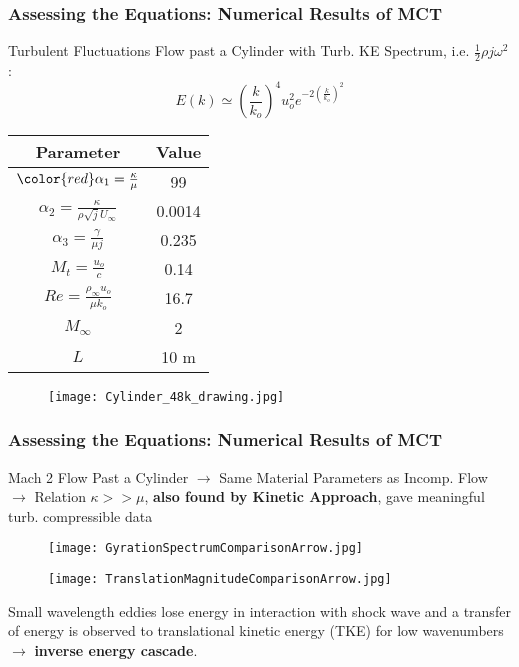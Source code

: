 \documentclass{beamer}
\begin{document}
\begin{frame}
\frametitle{Assessing the Equations: Numerical Results of MCT}
Turbulent Fluctuations Flow past a Cylinder with Turb. KE Spectrum, i.e. 
$\frac{1}{2}\rho j \omega^2$: $$E(k) \simeq (\frac{k}{k_{o}})^4 u_{o}^2 
e^{-2(\frac{k}{k_{o}})^2}$$
\begin{multicols}{2}
\begin{table}[h!]
\centering
 \begin{tabular}{||c | c||} 
 \hline
 Parameter & Value \\ [2ex] 
 \hline\hline
 ${\color{red}\alpha_{1} = \frac{\kappa}{\mu}}$ & 99 \\ 
 $\alpha_{2} = \frac{\kappa}{\rho \sqrt{j}U_{\infty}}$ & 0.0014 \\ 
 $\alpha_{3} = \frac{\gamma}{\mu j}$ & 0.235 \\ 
 $M_{t} = \frac{u_{o}}{c}$      & 0.14\\ 
 $Re = \frac{\rho_{\infty} u_{o}}{\mu k_{o}}$ & 16.7 \\ 
 $M_{\infty}$ & 2\\ 
 $L$ & 10 m\\ 
 \hline
 \end{tabular}
\end{table}
\begin{figure}
\texttt{[image: Cylinder\_48k\_drawing.jpg]}
\end{figure}
\end{multicols}
\end{frame}

\begin{frame}
 \frametitle{Assessing the Equations: Numerical Results of MCT}
 Mach 2 Flow Past a Cylinder $\rightarrow$ Same Material Parameters as 
Incomp. Flow \pause $\rightarrow$ Relation $\kappa >> \mu$, \textbf{also found 
by Kinetic Approach}, gave meaningful turb. compressible data \pause
 \begin{multicols}{2}
\begin{figure}
 \centering
  \texttt{[image: GyrationSpectrumComparisonArrow.jpg]}
\end{figure}
\begin{figure}
  \texttt{[image: TranslationMagnitudeComparisonArrow.jpg]}
\end{figure}
\end{multicols}
\small
Small wavelength eddies lose energy in interaction with shock wave and a 
transfer of energy is observed to translational kinetic energy (TKE) for low 
wavenumbers \pause $\rightarrow$ \textbf{inverse energy cascade}. 
\end{frame}
\end{document}
